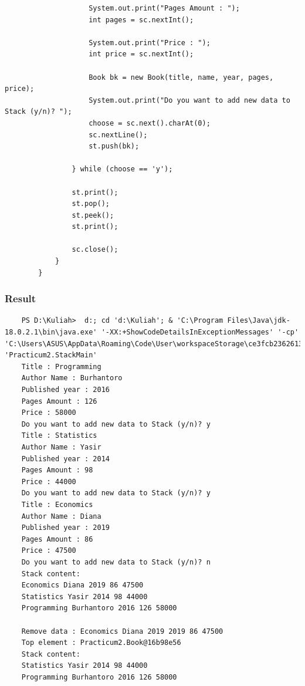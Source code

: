 \documentclass[12pt,titlepage]{article}
\begin{document}
\begin{enumerate}
\begin{verbatim}
                    System.out.print("Pages Amount : ");
                    int pages = sc.nextInt();

                    System.out.print("Price : ");
                    int price = sc.nextInt();

                    Book bk = new Book(title, name, year, pages, price);
                    System.out.print("Do you want to add new data to Stack (y/n)? ");
                    choose = sc.next().charAt(0);
                    sc.nextLine();
                    st.push(bk);

                } while (choose == 'y');

                st.print();
                st.pop();
                st.peek();
                st.print();
                
                sc.close();
            }
        }
    \end{verbatim}
\end{enumerate}

\subsubsection{Result}

\begin{verbatim}
    PS D:\Kuliah>  d:; cd 'd:\Kuliah'; & 'C:\Program Files\Java\jdk-18.0.2.1\bin\java.exe' '-XX:+ShowCodeDetailsInExceptionMessages' '-cp' 'C:\Users\ASUS\AppData\Roaming\Code\User\workspaceStorage\ce3fcb236261368a6cbd019dc8ddda8b\redhat.java\jdt_ws\Kuliah_28156aa7\bin' 'Practicum2.StackMain' 
    Title : Programming
    Author Name : Burhantoro
    Published year : 2016
    Pages Amount : 126
    Price : 58000
    Do you want to add new data to Stack (y/n)? y
    Title : Statistics
    Author Name : Yasir
    Published year : 2014
    Pages Amount : 98
    Price : 44000
    Do you want to add new data to Stack (y/n)? y
    Title : Economics
    Author Name : Diana
    Published year : 2019
    Pages Amount : 86
    Price : 47500
    Do you want to add new data to Stack (y/n)? n
    Stack content: 
    Economics Diana 2019 86 47500
    Statistics Yasir 2014 98 44000
    Programming Burhantoro 2016 126 58000

    Remove data : Economics Diana 2019 2019 86 47500
    Top element : Practicum2.Book@16b98e56
    Stack content:
    Statistics Yasir 2014 98 44000
    Programming Burhantoro 2016 126 58000
\end{verbatim}
\end{document}
